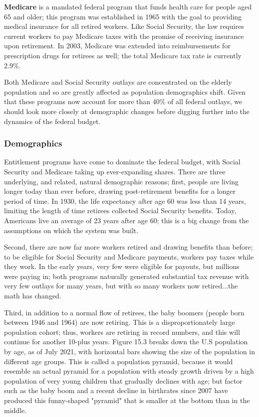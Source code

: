 \documentclass[11pt]{article} %
\begin{document}

\textbf{Medicare} is a mandated federal program that funds health care for people aged 65 and older; this program was established in 1965 with the goal to providing medical insurance for all retired workers. Like Social Security, the law requires current workers to pay Medicare taxes with the promise of receiving insurance upon retirement. In 2003, Medicare was extended into reimbursements for prescription drugs for retirees as well; the total Medicare tax rate is currently 2.9\%.

Both Medicare and Social Security outlays are concentrated on the elderly population and so are greatly affected as population demographics shift. Given that these programs now account for more than 40\% of all federal outlays, we should look more closely at demographic changes before digging further into the dynamics of the federal budget.

\subsubsection*{Demographics}
Entitlement programs have come to dominate the federal budget, with Social Security and Medicare taking up ever-expanding shares. There are three underlying, and related, natural demographic reasons; first, people are living longer today than ever before, drawing post-retirement benefits for a longer period of time. In 1930, the life expectancy after age 60 was less than 14 years, limiting the length of time retirees collected Social Security benefits. Today, Americans live an average of 23 years after age 60; this is a big change from the assumptions on which the system was built.

Second, there are now far more workers retired and drawing benefits than before; to be eligible for Social Security and Medicare payments, workers pay taxes while they work. In the early years, very few were eligible for payouts, but millions were paying in; both programs naturally generated substantial tax revenue with very few outlays for many years, but with so many workers now retired...the math has changed.

Third, in addition to a normal flow of retirees, the baby boomers (people born between 1946 and 1964) are now retiring. This is a disproportionately large population cohort; thus, workers are retiring in record numbers, and this will continue for another 10-plus years. Figure 15.3 breaks down the U.S population by age, as of July 2021, with horizontal bars showing the size of the population in different age groups. This is called a population pyramid, because it would resemble an actual pyramid for a population with steady growth driven by a high population of very young children that gradually declines with age; but factor such as the baby boom and a recent decline in birthrates since 2007 have produced this funny-shaped "pyramid" that is smaller at the bottom than in the middle.
\end{document}
